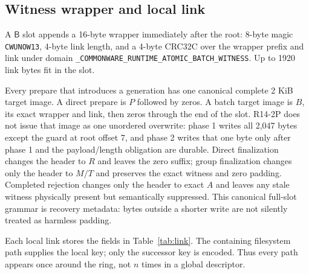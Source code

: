 \documentclass[10pt,twocolumn]{article}
\theoremstyle{remark}
\newcommand{\code}[1]{\texttt{#1}}
\newcommand{\Prepared}{\mathsf{B}}
\begin{document}
\subsection{Witness wrapper and local link}

A $\Prepared$ slot appends a 16-byte wrapper immediately after the root: 8-byte magic
\code{CWUNOW13}, 4-byte link length, and a 4-byte CRC32C over the wrapper prefix and link under
domain \code{\_COMMONWARE\_RUNTIME\_ATOMIC\_BATCH\_WITNESS}. Up to 1920 link bytes fit in the slot.

Every prepare that introduces a generation has one canonical complete 2 KiB target image. A direct
prepare is $P$ followed by zeros. A batch target image is $B$, its exact wrapper and link, then
zeros through the end of the slot. R14-2P does not issue that image as one unordered overwrite:
phase 1 writes all 2,047 bytes except the guard at root offset 7, and phase 2 writes that one byte
only after phase 1 and the payload/length obligation are durable. Direct finalization changes the
header to $R$ and leaves the zero suffix; group finalization changes only the header to $M/T$ and
preserves the exact witness and zero padding. Completed rejection changes only the header to exact
$A$ and leaves any stale witness physically present but semantically suppressed. This canonical
full-slot grammar is recovery metadata: bytes outside a shorter write are not silently treated as
harmless padding.

Each local link stores the fields in Table~\ref{tab:link}. The containing filesystem path supplies
the local key; only the successor key is encoded. Thus every path appears once around the ring,
not $n$ times in a global descriptor.
\end{document}
